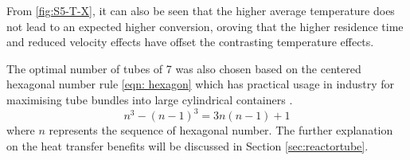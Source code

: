 From \cref{fig:S5-T-X}, it can also be seen that the higher average temperature does not lead to an expected higher conversion, oroving that the higher residence time and reduced velocity effects have offset the contrasting temperature effects.   

The optimal number of tubes of 7 was also chosen based on the centered hexagonal number rule \cref{eqn: hexagon} which has practical usage in industry for maximising tube bundles into large cylindrical containers \cite{noauthor_realiable_2018}. 
\begin{equation}
    n^3 - (n-1)^3 = 3n(n-1)+1
    \label{eqn: hexagon}
\end{equation}
where $n$ represents the sequence of hexagonal number. The further explanation on the heat transfer benefits will be discussed in Section \ref{sec:reactortube}.


